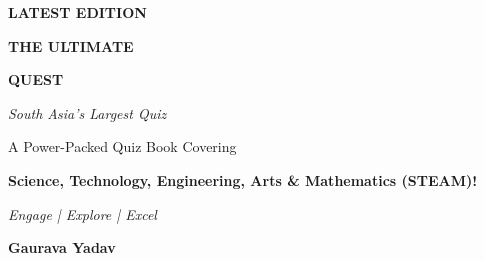 \begin{titlepage}
    \centering
    
    \vspace*{1.5cm}
    
    {\huge\bfseries\textcolor{questorange}{LATEST EDITION}\par}
    \vspace{0.7cm}
    
    {\Huge\bfseries\textcolor{questblue}{THE ULTIMATE}\par}
    \vspace{0.3cm}
    
    {\Huge\bfseries\textcolor{questblue}{QUEST}\par}
    \vspace{0.2cm}
    
    {\Large\textit{South Asia's Largest Quiz}\par}
    \vspace{1cm}
    
    {\large A Power-Packed Quiz Book Covering\par}
    \vspace{0.3cm}
    
    {\Large\bfseries Science, Technology, Engineering, Arts \& Mathematics (STEAM)!\par}
    \vspace{1.5cm}
    
    {\Large\textit{\textcolor{questorange}{Engage | Explore | Excel}}\par}
    \vspace{1.5cm}
    
    {\Large\bfseries Gaurava Yadav\par}
    
    \vfill
    
    
    \vspace{1.5cm}
\end{titlepage} 